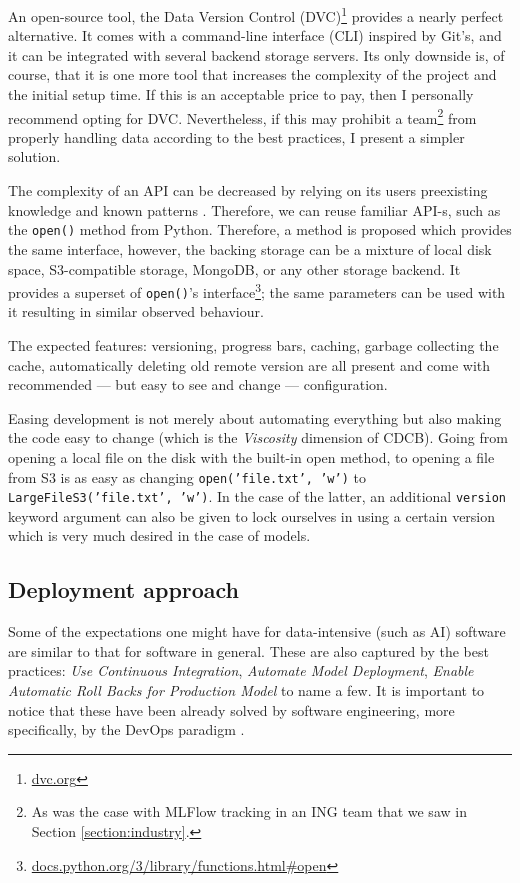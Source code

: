 An open-source tool, the Data Version Control (DVC)\footnote{\href{https://dvc.org/}{dvc.org}} provides a nearly perfect alternative. It comes with a command-line interface (CLI) inspired by Git's, and it can be integrated with several backend storage servers. Its only downside is, of course, that it is one more tool that increases the complexity of the project and the initial setup time. If this is an acceptable price to pay, then I personally recommend opting for DVC. Nevertheless, if this may prohibit a team\footnote{As was the case with MLFlow tracking in an ING team that we saw in Section \ref{section:industry}.} from properly handling data according to the best practices, I present a simpler solution.

The complexity of an API can be decreased by relying on its users preexisting knowledge and known patterns \cite{hermans2021programmer,ousterhout2018philosophy}. Therefore, we can reuse familiar API-s, such as the \texttt{open()} method from Python. Therefore, a method is proposed which provides the same interface, however, the backing storage can be a mixture of local disk space, S3-compatible storage, MongoDB, or any other storage backend. It provides a superset of \texttt{open()}'s interface\footnote{\href{https://docs.python.org/3/library/functions.html\#open}{docs.python.org/3/library/functions.html\#open}}; the same parameters can be used with it resulting in similar observed behaviour.

The expected features: versioning, progress bars, caching, garbage collecting the cache, automatically deleting old remote version are all present and come with recommended --- but easy to see and change --- configuration.

Easing development is not merely about automating everything but also making the code easy to change (which is the \textit{Viscosity} dimension of CDCB). Going from opening a local file on the disk with the built-in open method, to opening  a file from S3 is as easy as changing \texttt{open('file.txt', 'w')} to \texttt{LargeFileS3('file.txt', 'w')}. In the case of the latter, an additional \texttt{version} keyword argument can also be given to lock ourselves in using a certain version which is very much desired in the case of models.

\subsection{Deployment approach}

Some of the expectations one might have for data-intensive (such as AI) software are similar to that for software in general. These are also captured by the best practices: \textit{Use Continuous Integration}, \textit{Automate Model Deployment}, \textit{Enable Automatic Roll Backs for Production Model} to name a few. It is important to notice that these have been already solved by software engineering, more specifically, by the DevOps paradigm \cite{leite2019survey}. 

